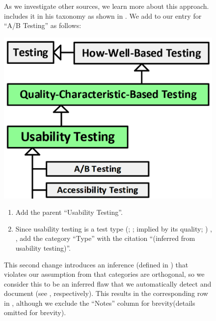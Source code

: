 \begin{figure}[h!]
As we investigate other sources, we learn more about this approach. \ifnotpaper
\else \citeauthor{Firesmith2015} \fi \citet[p.~58]{Firesmith2015} includes it
in his taxonomy as shown in . We add to our
entry for ``A/B Testing'' as follows:

\begin{minipage}{0.45\linewidth}
    \vspace{0.5cm}
    \includegraphics[width=\linewidth]{assets/images/a-b testing 2.png}
    \label{fig:Firesmith-A-B-Testing}
    \vspace{0.5cm}
\end{minipage}
\begin{minipage}{\ifnotpaper 0.53\else 0.5\fi\linewidth}
    \begin{enumerate}
        \item Add the parent ``Usability Testing''.
        \item Since usability testing is a test type \ifnotpaper
                  (\citealp[pp.~22, 26\=/27]{IEEE2022};
                  \citeyear[pp.~7, 40, Tab.~A.1]{IEEE2021c};
                  implied by its quality; \citealp[p.~53]{Firesmith2015})\else
                  \cite[pp.~22, 26\=/27]{IEEE2022},
                  \cite[pp.~7, 40, Tab.~A.1]{IEEE2021c}\fi, add the category
              ``Type'' with the citation ``(inferred from usability testing)''.
    \end{enumerate}
\end{minipage}
This second change introduces an inference \ifnotpaper (defined in )
\fi that violates our assumption \ifnotpaper from  \fi that
categories are orthogonal, so we consider this to be an inferred flaw that we
automatically detect and document \ifnotpaper (see , respectively). This results in the corresponding row
    in , although we exclude the ``Notes''
    column for brevity\else (details omitted for brevity)\fi.


\end{figure}
